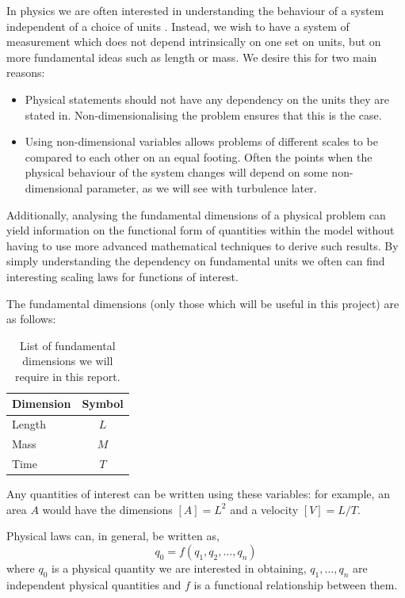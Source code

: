 In physics we are often interested in understanding the behaviour of a system independent of a
choice of units \citet{0143-0807-31-4-019}. Instead, we wish to
have a system of measurement which does not depend intrinsically on one set on units, but on more 
fundamental ideas such as length or mass. We desire this for two main reasons:
\begin{itemize}
	\item Physical statements should not have any dependency on the units they are stated in.
	Non-dimensionalising the problem ensures that this is the case.
	\item Using non-dimensional variables allows problems of different scales to be compared to each 
	other on an equal footing. Often the points when the physical behaviour of the system changes 
	will depend on some non-dimensional parameter, as we will see with turbulence later.
\end{itemize}

Additionally, analysing the fundamental dimensions of a physical problem can yield information on the
functional form of quantities within the model without having to use more advanced mathematical
techniques to derive such results. By simply understanding the dependency on fundamental units we
often can find interesting scaling laws for functions of interest.

The fundamental dimensions (only those which will be useful in this project) are as follows:
\begin{table}[h]
\centering
\begin{tabular}{l c}
Dimension & Symbol \\
\hline
Length & $L$ \\
Mass & $M$ \\
Time & $T$
\end{tabular}
\caption[List of fundamental dimensions]{List of fundamental dimensions we will require in this report.}
\end{table}

Any quantities of interest can be written using these variables: for example, an area $A$ would have 
the dimensions $[A] = L^2$ and a velocity $[V] = L/T$.

Physical laws can, in general, be written as, \citet{0143-0807-31-4-019}
\begin{equation} \label{functional}
q_{0} = f(q_1,q_2,\ldots,q_n)
\end{equation}
where $q_0$ is a physical quantity we are interested in obtaining, $q_1,\ldots,q_n$ are independent
physical quantities and $f$ is a functional relationship between them.

